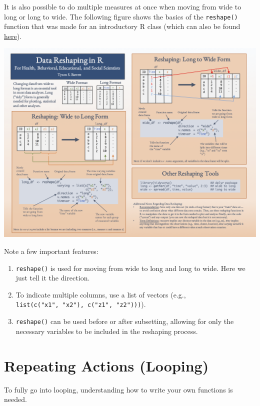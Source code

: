 \documentclass[]{tufte-book}
\providecommand{\tightlist}{%
  \setlength{\itemsep}{0pt}\setlength{\parskip}{0pt}}
\theoremstyle{definition}
\theoremstyle{definition}
\theoremstyle{remark}
\begin{document}
It is also possible to do multiple measures at once when moving from
wide to long or long to wide. The following figure shows the basics of
the \texttt{reshape()} function that was made for an introductory R
class (which can also be found
\href{https://tysonstanley.github.io/assets/images/DataCleaning_Handout.pdf}{here}).

\includegraphics[width=\linewidth]{DataCleaning_Handout.png}

Note a few important features:

\begin{enumerate}
\def\labelenumi{\arabic{enumi}.}
\tightlist
\item
  \texttt{reshape()} is used for moving from wide to long and long to
  wide. Here we just tell it the direction.
\item
  To indicate multiple columns, use a list of vectors (e.g.,
  \texttt{list(c("x1",\ "x2"),\ c("z1",\ "z2")))}).
\item
  \texttt{reshape()} can be used before or after subsetting, allowing
  for only the necessary variables to be included in the reshaping
  process.
\end{enumerate}

\section*{Repeating Actions (Looping)}\label{repeating-actions-looping}

To fully go into looping, understanding how to write your own functions
is needed.
\end{document}
